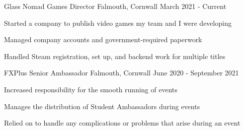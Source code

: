 

\begin{cventries}
    \cventry
        {Glass Nomad Games}
        {Director}
        {Falmouth, Cornwall}
        {March 2021 - Current}
        {
            \begin{cvitems}
                \item Started a company to publish video games my team and I were developing
                \item Managed company accounts and government-required paperwork
                \item Handled Steam registration, set up, and backend work for multiple titles
            \end{cvitems}
        }


    \cventry
        {FXPlus}
        {Senior Ambassador}
        {Falmouth, Cornwall}
        {June 2020 - September 2021}
        {
            \begin{cvitems}
                \item Increased responsibility for the smooth running of events
                \item Manages the distribution of Student Ambassadors during events
                \item Relied on to handle any complications or problems that arise during an event
            \end{cvitems}
        }


\end{cventries}
